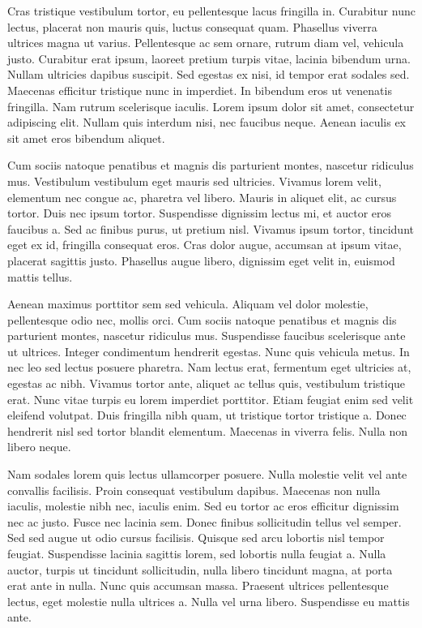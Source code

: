Cras tristique vestibulum tortor, eu pellentesque lacus fringilla in. Curabitur nunc lectus, placerat non mauris quis, luctus consequat quam. Phasellus viverra ultrices magna ut varius. Pellentesque ac sem ornare, rutrum diam vel, vehicula justo. Curabitur erat ipsum, laoreet pretium turpis vitae, lacinia bibendum urna. Nullam ultricies dapibus suscipit. Sed egestas ex nisi, id tempor erat sodales sed. Maecenas efficitur tristique nunc in imperdiet. In bibendum eros ut venenatis fringilla. Nam rutrum scelerisque iaculis. Lorem ipsum dolor sit amet, consectetur adipiscing elit. Nullam quis interdum nisi, nec faucibus neque. Aenean iaculis ex sit amet eros bibendum aliquet.

Cum sociis natoque penatibus et magnis dis parturient montes, nascetur ridiculus mus. Vestibulum vestibulum eget mauris sed ultricies. Vivamus lorem velit, elementum nec congue ac, pharetra vel libero. Mauris in aliquet elit, ac cursus tortor. Duis nec ipsum tortor. Suspendisse dignissim lectus mi, et auctor eros faucibus a. Sed ac finibus purus, ut pretium nisl. Vivamus ipsum tortor, tincidunt eget ex id, fringilla consequat eros. Cras dolor augue, accumsan at ipsum vitae, placerat sagittis justo. Phasellus augue libero, dignissim eget velit in, euismod mattis tellus.

Aenean maximus porttitor sem sed vehicula. Aliquam vel dolor molestie, pellentesque odio nec, mollis orci. Cum sociis natoque penatibus et magnis dis parturient montes, nascetur ridiculus mus. Suspendisse faucibus scelerisque ante ut ultrices. Integer condimentum hendrerit egestas. Nunc quis vehicula metus. In nec leo sed lectus posuere pharetra. Nam lectus erat, fermentum eget ultricies at, egestas ac nibh. Vivamus tortor ante, aliquet ac tellus quis, vestibulum tristique erat. Nunc vitae turpis eu lorem imperdiet porttitor. Etiam feugiat enim sed velit eleifend volutpat. Duis fringilla nibh quam, ut tristique tortor tristique a. Donec hendrerit nisl sed tortor blandit elementum. Maecenas in viverra felis. Nulla non libero neque.

Nam sodales lorem quis lectus ullamcorper posuere. Nulla molestie velit vel ante convallis facilisis. Proin consequat vestibulum dapibus. Maecenas non nulla iaculis, molestie nibh nec, iaculis enim. Sed eu tortor ac eros efficitur dignissim nec ac justo. Fusce nec lacinia sem. Donec finibus sollicitudin tellus vel semper. Sed sed augue ut odio cursus facilisis. Quisque sed arcu lobortis nisl tempor feugiat. Suspendisse lacinia sagittis lorem, sed lobortis nulla feugiat a. Nulla auctor, turpis ut tincidunt sollicitudin, nulla libero tincidunt magna, at porta erat ante in nulla. Nunc quis accumsan massa. Praesent ultrices pellentesque lectus, eget molestie nulla ultrices a. Nulla vel urna libero. Suspendisse eu mattis ante. 
